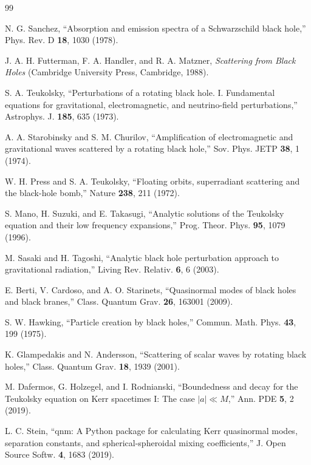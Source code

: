 \documentclass[UTF8,a4paper,11pt]{ctexart}
\begin{document}
\begin{thebibliography}{99}

N. G. Sanchez,
``Absorption and emission spectra of a Schwarzschild black hole,''
Phys. Rev. D \textbf{18}, 1030 (1978).

J. A. H. Futterman, F. A. Handler, and R. A. Matzner,
\textit{Scattering from Black Holes}
(Cambridge University Press, Cambridge, 1988).

S. A. Teukolsky,
``Perturbations of a rotating black hole. I. Fundamental equations for gravitational, electromagnetic, and neutrino-field perturbations,''
Astrophys. J. \textbf{185}, 635 (1973).

A. A. Starobinsky and S. M. Churilov,
``Amplification of electromagnetic and gravitational waves scattered by a rotating black hole,''
Sov. Phys. JETP \textbf{38}, 1 (1974).

W. H. Press and S. A. Teukolsky,
``Floating orbits, superradiant scattering and the black-hole bomb,''
Nature \textbf{238}, 211 (1972).

S. Mano, H. Suzuki, and E. Takasugi,
``Analytic solutions of the Teukolsky equation and their low frequency expansions,''
Prog. Theor. Phys. \textbf{95}, 1079 (1996).

M. Sasaki and H. Tagoshi,
``Analytic black hole perturbation approach to gravitational radiation,''
Living Rev. Relativ. \textbf{6}, 6 (2003).

E. Berti, V. Cardoso, and A. O. Starinets,
``Quasinormal modes of black holes and black branes,''
Class. Quantum Grav. \textbf{26}, 163001 (2009).

S. W. Hawking,
``Particle creation by black holes,''
Commun. Math. Phys. \textbf{43}, 199 (1975).

K. Glampedakis and N. Andersson,
``Scattering of scalar waves by rotating black holes,''
Class. Quantum Grav. \textbf{18}, 1939 (2001).

M. Dafermos, G. Holzegel, and I. Rodnianski,
``Boundedness and decay for the Teukolsky equation on Kerr spacetimes I: The case $|a|\ll M$,''
Ann. PDE \textbf{5}, 2 (2019).

L. C. Stein,
``qnm: A Python package for calculating Kerr quasinormal modes, separation constants, and spherical-spheroidal mixing coefficients,''
J. Open Source Softw. \textbf{4}, 1683 (2019).

\end{thebibliography}
\end{document}
